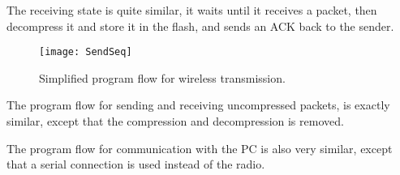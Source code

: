 The receiving state is quite similar, it waits until it receives a packet, then decompress it and store it in the flash, and sends an ACK back to the sender.


\begin{figure}[H]
\centering
\texttt{[image: SendSeq]}
\caption{Simplified program flow for wireless transmission.}
\label{fig:SendReceiveSeq}
\end{figure}

The program flow for sending and receiving uncompressed packets, is exactly similar, except that the compression and decompression is removed.

The program flow for communication with the PC is also very similar, except that a serial connection is used instead of the radio.